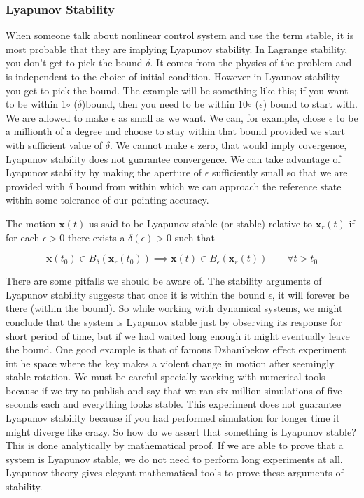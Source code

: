 \documentclass{article}
\begin{document}
\subsubsection*{Lyapunov Stability}
When someone talk about nonlinear control system and use the term stable, it is most probable that they are implying Lyapunov stability. In Lagrange stability, you don't get to pick the bound $\delta$. It comes from the physics of the problem and is independent to the choice of initial condition. However in Lyaunov stability you get to pick the bound. The example will be something like this; if you want to be within 1$\circ$ ($\delta$)bound, then you need to be within 10$\circ$ ($\epsilon$) bound to start with. We are allowed to make $\epsilon$ as small as we want. We can, for example, chose $\epsilon$ to be a millionth of a degree and  choose to stay within that bound provided we start with sufficient value of $\delta$. We cannot make $\epsilon$ zero, that would imply covergence, Lyapunov stability does not guarantee convergence. We can take advantage of Lyapunov stability by making the aperture of $\epsilon$ sufficiently small so that we are provided with $\delta$ bound from within which we can approach the reference state within some tolerance of our pointing accuracy.

The motion $\bm{x}(t)$ us said to be Lyapunov stable (or stable) relative to $\bm{x}_{r}(t)$ if for each $\epsilon>0$ there exists a $\delta(\epsilon)>0$ such that

$$
\bm{x}(t_{0})\in B_{\delta}(\bm{x}_{r}(t_{0}))\implies\bm{x}(t)\in B_{\epsilon}(\bm{x}_{r}(t))\quad\quad\forall t>t_{0}
$$

There are some pitfalls we should be aware of. The stability arguments of Lyapunov stability suggests that once it is within the bound $\epsilon$, it will forever be there (within the bound). So while working with dynamical systems, we might conclude that the system is Lyapunov stable just by observing its response for short period of time, but if we had waited long enough it might eventually leave the bound. One good example is that of famous Dzhanibekov effect experiment int he space where the key makes a violent change in motion after seemingly stable rotation. We must be careful specially working with numerical tools because if we try to publish and say that we ran six million simulations of five seconds each and everything looks stable. This experiment does not guarantee Lyapunov stability because if you had performed simulation for longer time it might diverge like crazy. So how do we assert that something is Lyapunov stable? This is done analytically by mathematical proof. If we are able to prove that a system is Lyapunov stable, we do not need to perform long experiments at all. Lyapunov theory gives elegant mathematical tools to prove these arguments of stability.
\end{document}
